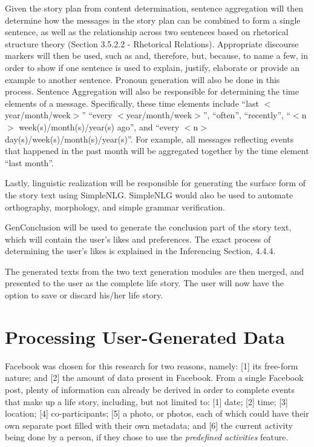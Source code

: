 Given the story plan from content determination, sentence aggregation will then determine how the messages in the story plan can be combined to form a single sentence, as well as the relationship across two sentences based on rhetorical structure theory (Section 3.5.2.2 - Rhetorical Relations). Appropriate discourse markers will then be used, such as and, therefore, but, because, to name a few, in order to show if one sentence is used to explain, justify, elaborate or provide an example to another sentence. Pronoun generation will also be done in this process. Sentence Aggregation will also be responsible for determining the time elements of a message. Specifically, these time elements include ``last $<$year/month/week$>$'' ``every $<$year/month/week$>$'', ``often'', ``recently'', ``$<$n$>$ week(s)/month(s)/year(s) ago'', and ``every $<$n$>$ day(s)/week(s)/month(s)/year(s)''. For example, all messages reflecting events that happened in the past month will be aggregated together by the time element ``last month''.

Lastly, linguistic realization will be responsible for generating the surface form of the story text using SimpleNLG. SimpleNLG would also be used to automate orthography, morphology, and simple grammar verification.

GenConclusion will be used to generate the conclusion part of the story text, which will contain the user's likes and preferences. The exact process of determining the user's likes is explained in the Inferencing Section, 4.4.4. 

The generated texts from the two text generation modules are then merged, and presented to the user as the complete life story. The user will now have the option to save or discard his/her life story.

\section{Processing User-Generated Data}
Facebook was chosen for this research for two reasons, namely: [1] its free-form nature; and [2] the amount of data present in Facebook. From a single Facebook post, plenty of information can already be derived in order to complete events that make up a life story, including, but not limited to: [1] date; [2] time; [3] location; [4] co-participants; [5] a photo, or photos, each of which could have their own separate post filled with their own metadata; and [6] the current activity being done by a person, if they chose to use the \textit{predefined activities} feature.

